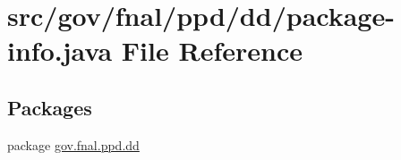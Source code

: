 \hypertarget{dd_2package-info_8java}{\section{src/gov/fnal/ppd/dd/package-\/info.java File Reference}
\label{dd_2package-info_8java}
}
\subsection*{Packages}
\begin{DoxyCompactItemize}
\item 
package \hyperlink{namespacegov_1_1fnal_1_1ppd_1_1dd}{gov.\-fnal.\-ppd.\-dd}
\end{DoxyCompactItemize}
